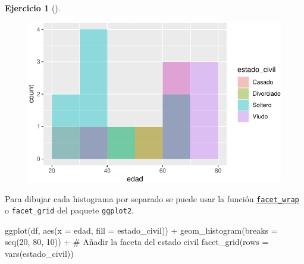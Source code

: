 \documentclass[
  a4paper,
]{scrreport}
\newenvironment{Shaded}{\begin{snugshade}}{\end{snugshade}}
\newcommand{\AttributeTok}[1]{\textcolor[rgb]{0.40,0.45,0.13}{#1}}
\newcommand{\CommentTok}[1]{\textcolor[rgb]{0.37,0.37,0.37}{#1}}
\newcommand{\DecValTok}[1]{\textcolor[rgb]{0.68,0.00,0.00}{#1}}
\newcommand{\FunctionTok}[1]{\textcolor[rgb]{0.28,0.35,0.67}{#1}}
\newcommand{\NormalTok}[1]{\textcolor[rgb]{0.00,0.23,0.31}{#1}}
\newcommand{\SpecialCharTok}[1]{\textcolor[rgb]{0.37,0.37,0.37}{#1}}
\theoremstyle{definition}
\newtheorem{exercise}{Ejercicio}[chapter]
\theoremstyle{remark}
\begin{document}
\begin{exercise}[]
\begin{enumerate}
\begin{tcolorbox}
  \begin{figure}[H]

  {\centering \includegraphics{03-frecuencias-graficos_files/figure-pdf/unnamed-chunk-34-1.pdf}

  }

  \end{figure}

  Para dibujar cada histograma por separado se puede usar la función
  \href{https://aprendeconalf.es/manual-r/07-graficos.html\#facetas}{\texttt{facet\_wrap}}
  o \texttt{facet\_grid} del paquete \texttt{ggplot2}.

\begin{Shaded}
\begin{Highlighting}[]
\FunctionTok{ggplot}\NormalTok{(df, }\FunctionTok{aes}\NormalTok{(}\AttributeTok{x =}\NormalTok{ edad, }\AttributeTok{fill =}\NormalTok{ estado\_civil)) }\SpecialCharTok{+}
    \FunctionTok{geom\_histogram}\NormalTok{(}\AttributeTok{breaks =} \FunctionTok{seq}\NormalTok{(}\DecValTok{20}\NormalTok{, }\DecValTok{80}\NormalTok{, }\DecValTok{10}\NormalTok{)) }\SpecialCharTok{+}
    \CommentTok{\# Añadir la faceta del estado civil}
    \FunctionTok{facet\_grid}\NormalTok{(}\AttributeTok{rows =} \FunctionTok{vars}\NormalTok{(estado\_civil))}
\end{Highlighting}
\end{Shaded}

  \begin{figure}[H]


\end{figure}
\end{tcolorbox}
\end{enumerate}
\end{exercise}
\end{document}
